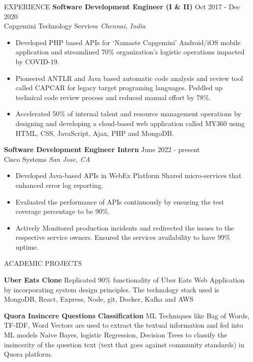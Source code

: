\documentclass{resume} %
\begin{document}
\begin{rSection}{EXPERIENCE}
\vspace{-0.10em}
\textbf{Software Development Engineer (I \& II)} \hfill Oct  2017 - Dec 2020\\
Capgemini Technology Services \hfill \textit{Chennai, India}
 \begin{itemize}
    \itemsep -1pt {} 
     \item Developed PHP based APIs for ‘Namaste Capgemini’ Android/iOS mobile application and streamlined 70\% organization’s logistic operations impacted by COVID-19.
     \item 	Pioneered ANTLR and Java based automatic code analysis and review tool called CAPCAR for legacy target programing languages. Peddled up technical code review process and reduced manual effort by 78\%. 
     \item Accelerated 50\% of internal talent and resource management operations by designing and developing a cloud-based web application called MY360 using HTML, CSS, JavaScript, Ajax, PHP and MongoDB.
 \end{itemize}
 \vspace{-0.10em}
\textbf{Software Development Engineer Intern} \hfill June  2022 - present\\
Cisco Systems \hfill \textit{San Jose, CA}
 \begin{itemize}
    \itemsep -2pt {} 
     \item Developed Java-based APIs in WebEx Platform Shared micro-services that enhanced error log reporting.
     \item Evaluated the performance of APIs continuously by ensuring the test coverage percentage to be 90\%.
     \item Actively Monitored production incidents and redirected the issues to the respective service owners. Ensured the services availability to have 99\% uptime.
 \end{itemize}


\end{rSection} 

\vspace{-0.5em}
\begin{rSection}{ACADEMIC PROJECTS}
\vspace{-1.5em}
\item \textbf{Uber Eats Clone}  {Replicated 90\%  functionality of Uber Eats Web Application by  incorporating system design principles. The technology stack used is MongoDB, React, Express, Node, git, Docker, Kafka and AWS }
  \vspace{-0.1em}
\item \textbf{Quora Insincere Questions Classification  }  {ML Techniques like Bag of Words, TF-IDF, Word Vectors are used to extract the textual information and fed into ML models Naive Bayes, logistic Regression, Decision Trees to classify the insincerity of the question text (text that goes against community standards) in Quora platform.  }
  \vspace{-0.2em}
\end{rSection} 
\end{document}
